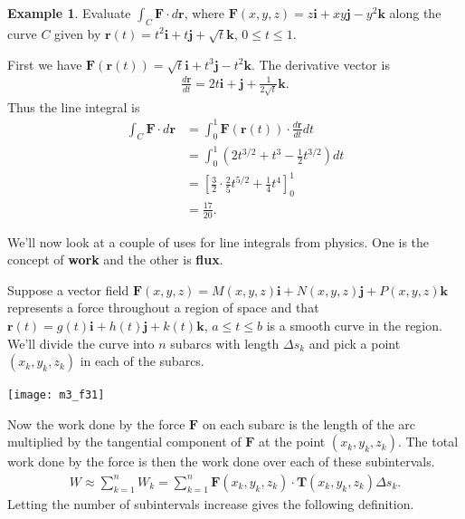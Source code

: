 \documentclass[12pt, letter]{article}
\theoremstyle{plain}
\numberwithin{theorem}{section}
\theoremstyle{definition}
\newtheorem{example}[theorem]{Example}
\begin{document}
\bigskip

\hrulefill

\bigskip

\begin{example}
Evaluate $\int_C \bm{F}\cdot d\bm{r}$, where $\bm{F}(x,y,z) = z\bm{i}+xy\bm{j}-y^2\bm{k}$ along the curve $C$ given by $\bm{r}(t) = t^2\bm{i}+t\bm{j}+\sqrt{t}\bm{k}$, $0\leq t\leq 1$.

\bigskip

First we have $\bm{F}(\bm{r}(t)) = \sqrt{t}\bm{i}+t^3\bm{j}-t^2\bm{k}$. The derivative vector is
\begin{align*}
\frac{d\bm{r}}{dt} = 2t\bm{i} + \bm{j}+\frac{1}{2\sqrt{t}}\bm{k}.
\end{align*}
Thus the line integral is
\begin{align*}
\int_C \bm{F}\cdot d\bm{r} &= \int_0^1 \bm{F}(\bm{r}(t)) \cdot \frac{d\bm{r}}{dt}dt\\
&= \int_0^1 \left(2t^{3/2}+t^3-\frac{1}{2}t^{3/2}\right)dt\\
&= \left[\frac{3}{2}\cdot\frac{2}{5} t^{5/2} + \frac{1}{4}t^4\right]_0^1\\
&=\frac{17}{20}.
\end{align*}
\end{example}

\bigskip

\hrulefill

\bigskip

We'll now look at a couple of uses for line integrals from physics. One is the concept of \textbf{work} and the other is \textbf{flux}.

\bigskip

Suppose a vector field $\bm{F}(x,y,z) = M(x,y,z)\bm{i}+N(x,y,z)\bm{j}+P(x,y,z)\bm{k}$ represents a force throughout a region of space and that $\bm{r}(t) = g(t)\bm{i}+h(t)\bm{j}+k(t)\bm{k}$, $a\leq t \leq b$ is a smooth curve in the region. We'll divide the curve into $n$ subarcs with length $\Delta s_k$ and pick a point $(x_k,y_k,z_k)$ in each of the subarcs.

\bigskip

\begin{center}
\texttt{[image: m3\_f31]}
\end{center}

\bigskip

Now the work done by the force $\bm{F}$ on each subarc is the length of the arc multiplied by the tangential component of $\bm{F}$ at the point $(x_k,y_k,z_k)$. The total work done by the force is then the work done over each of these subintervals.
\begin{align*}
W \approx \sum_{k=1}^n W_k = \sum_{k=1}^n \bm{F}(x_k,y_k,z_k) \cdot \bm{T}(x_k,y_k,z_k) \Delta s_k.
\end{align*}
Letting the number of subintervals increase gives the following definition.
\end{document}
